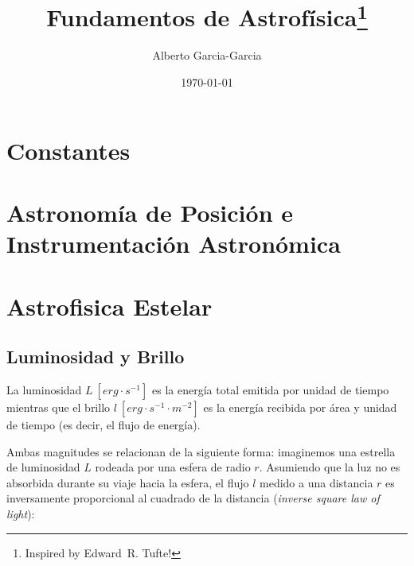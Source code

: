 \documentclass{tufte-handout}
\title{Fundamentos de Astrofísica\thanks{Inspired by Edward~R. Tufte!}}
\author[Alberto Garcia-Garcia]{Alberto Garcia-Garcia}
\date{\today}  %
\begin{document}
\maketitle%

\begin{abstract}
%
\end{abstract}

\tableofcontents

\clearpage

\section{Constantes}

\clearpage

\section{Astronomía de Posición e Instrumentación Astronómica}

\clearpage

\section{Astrofisica Estelar}

\subsection{Luminosidad y Brillo}

La luminosidad $L~[erg \cdot s^{-1}]$ es la energía total emitida por unidad de tiempo mientras que el brillo $l~[erg \cdot s^{-1} \cdot m^{-2}]$ es la energía recibida por área y unidad de tiempo (es decir, el flujo de energía).


Ambas magnitudes se relacionan de la siguiente forma: imaginemos una estrella de luminosidad $L$ rodeada por una esfera de radio $r$. Asumiendo que la luz no es absorbida durante su viaje hacia la esfera, el flujo $l$ medido a una distancia $r$ es inversamente proporcional al cuadrado de la distancia (\emph{inverse square law of light}):
\end{document}
